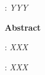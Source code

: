 \begin{titlepage}
    : {\itshape YYY }
    \par
    \vspace{4\baselineskip}
    \begin{center}
	{\large\bfseries Abstract}\par\bigskip
    \end{center}
    : {\itshape XXX}\par
    \vspace*{1\baselineskip}
    {\itshape

    }
    \vspace*{1\baselineskip}

    : {\itshape XXX}

\end{titlepage}
